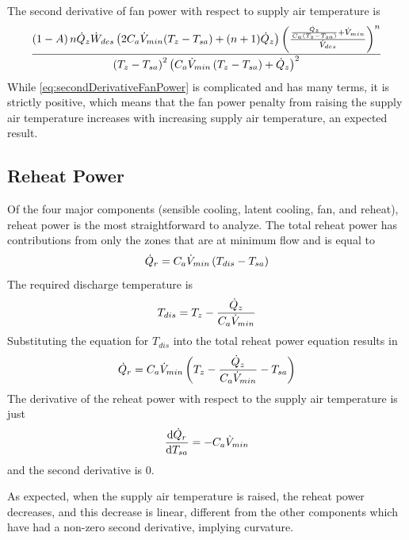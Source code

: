 The second derivative of fan power with respect to supply air
temperature is 
\begin{equation}\label{eq:secondDerivativeFanPower}
    \frac{\left(1-A\right) n \dot{Q}_{z} \dot{W}_{des} \left(2 C_{a}
            \dot{V}_{min}
                    (T_{z}-T_{sa}{})+(n+1) \dot{Q}_{z}\right) \left(\frac{\frac{\dot{Q}_{z}}{C_{a}
                (T_{z}-T_{sa}{})}+\dot{V}_{min}}{\dot{V}_{des}}\right)^n}{\left(T_{z}-T_{sa}{}\right)^2
            \left(C_{a} \dot{V}_{min} \left(T_{z}-T_{sa}{}\right)+\dot{Q}_{z}\right)^2}
\end{equation}
While  \ref{eq:secondDerivativeFanPower} is complicated and
has many terms, it is strictly positive, which means that the fan power
penalty from raising the supply air temperature increases with
increasing supply air temperature, an expected result. 

\subsection{Reheat Power}

Of the four major components (sensible cooling, latent cooling, fan, and
reheat), reheat power is the most straightforward to analyze. The total
reheat power has contributions from only the zones that are at minimum
flow and is equal to
\begin{equation}
    \dot{Q}_{r} = C_{a} \dot{V}_{min} \left(T_{dis} - T_{sa}{} \right)
\end{equation}
The required discharge temperature is
\begin{equation}
    T_{dis} = T_{z} - \frac{\dot{Q}_{z}}{C_{a} \dot{V}_{min} }
\end{equation}
Substituting the equation for \(T_{dis}\) into the total reheat power
equation results in
\begin{equation}
    \dot{Q}_{r} = C_{a} \dot{V}_{min} \left(T_{z} - \frac{\dot{Q}_{z}}{C_{a} \dot{V}_{min} } - T_{sa}{} \right) 
\end{equation}
The derivative of the reheat power with respect to the supply air
temperature is just
\begin{equation}
    \dv{\dot{Q}_{r}}{T_{sa}{}} = -C_{a} \dot{V}_{min}
\end{equation}
and the second derivative is 0. 

As expected, when the supply air temperature is raised, the reheat power
decreases, and this decrease is linear, different from the other
components which have had a non-zero second derivative, implying
curvature. 

